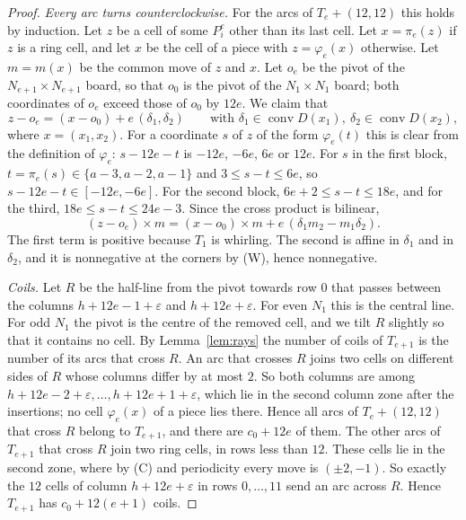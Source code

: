 \documentclass[11pt]{amsart}
\theoremstyle{remark}
\begin{document}
\begin{proof}
\emph{Every arc turns counterclockwise.} For the arcs of $T_e+(12,12)$ this holds by induction. Let $z$ be a cell
of some $P_i^e$ other than its last cell. Let $x=\pi_e(z)$ if $z$ is a ring cell, and let $x$ be the cell of a piece
with $z=\varphi_e(x)$ otherwise. Let $m=m(x)$ be the common move of $z$ and $x$. Let $o_e$ be the pivot of the
$N_{e+1}\times N_{e+1}$ board, so that $o_0$ is the pivot of the
$N_1\times N_1$ board; both coordinates of $o_e$ exceed those of $o_0$ by $12e$. We claim that
\[ z-o_e=(x-o_0)+e\,(\delta_1,\delta_2)\qquad\text{with }\delta_1\in\operatorname{conv}D(x_1),\
\delta_2\in\operatorname{conv}D(x_2), \]
where $x=(x_1,x_2)$. For a coordinate $s$ of $z$ of the form $\varphi_e(t)$ this is clear from the definition of
$\varphi_e$: $s-12e-t$ is $-12e$, $-6e$, $6e$ or $12e$. For $s$ in the first block, $t=\pi_e(s)\in\{a-3,a-2,a-1\}$
and $3\le s-t\le6e$, so $s-12e-t\in[-12e,-6e]$. For the second block, $6e+2\le s-t\le18e$, and for the third,
$18e\le s-t\le24e-3$. Since the cross product is bilinear,
\[ (z-o_e)\times m=(x-o_0)\times m+e\,(\delta_1m_2-m_1\delta_2). \]
The first term is positive because $T_1$ is whirling. The second is affine in $\delta_1$ and in $\delta_2$, and it is
nonnegative at the corners by (W), hence nonnegative.

\emph{Coils.} Let $R$ be the half-line from the pivot towards row $0$ that passes between the columns
$h+12e-1+\varepsilon$ and $h+12e+\varepsilon$. For even $N_1$ this is the central line. For odd $N_1$
the pivot is the centre of the removed cell, and we tilt $R$ slightly so that it contains no cell. By
Lemma~\ref{lem:rays} the number of coils of $T_{e+1}$ is the number of its arcs that cross $R$. An arc that crosses
$R$ joins two cells on different sides of $R$ whose columns differ by at most $2$. So both columns are among
$h+12e-2+\varepsilon,\dots,h+12e+1+\varepsilon$, which lie in the second column zone after the insertions; no cell
$\varphi_e(x)$ of a piece lies there. Hence all arcs of $T_e+(12,12)$ that cross $R$ belong to $T_{e+1}$, and there
are $c_0+12e$ of them. The other arcs of $T_{e+1}$ that cross $R$ join two ring cells, in rows less than $12$. These
cells lie in the second zone, where by (C) and periodicity every move is $(\pm2,-1)$. So exactly the $12$ cells of
column $h+12e+\varepsilon$ in rows $0,\dots,11$ send an arc across $R$. Hence $T_{e+1}$ has $c_0+12(e+1)$ coils.
\end{proof}
\end{document}
